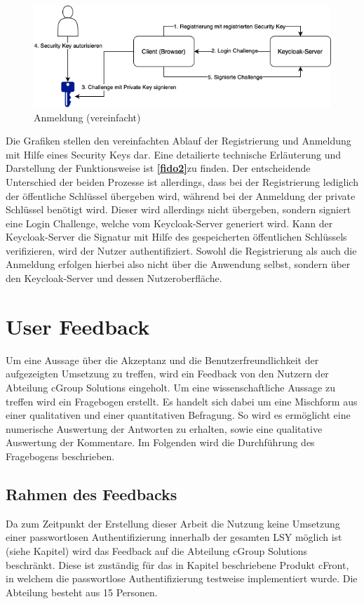 \begin{figure}[H]
	\centering 
	\includegraphics[width=1\textwidth]{img/abbildungen/login_simplified.png}
	\captionsetup{format=hang}
	\caption{Anmeldung (vereinfacht)}
\end{figure}

Die Grafiken stellen den vereinfachten Ablauf der Registrierung und Anmeldung mit Hilfe eines Security Keys dar. Eine detailierte technische Erläuterung und Darstellung der Funktionsweise ist \textbf{\ref{fido2}}zu finden. Der entscheidende Unterschied der beiden Prozesse ist allerdings, dass bei der Registrierung lediglich der öffentliche Schlüssel übergeben wird, während bei der Anmeldung der private Schlüssel benötigt wird. Dieser wird allerdings nicht übergeben, sondern signiert eine Login Challenge, welche vom Keycloak-Server generiert wird. Kann der Keycloak-Server die Signatur mit Hilfe des gespeicherten öffentlichen Schlüssels verifizieren, wird der Nutzer authentifiziert. Sowohl die Registrierung als auch die Anmeldung erfolgen hierbei also nicht über die Anwendung selbst, sondern über den Keycloak-Server und dessen Nutzeroberfläche.

\section{User Feedback}
Um eine Aussage über die Akzeptanz und die Benutzerfreundlichkeit der aufgezeigten Umsetzung zu treffen, wird ein Feedback von den Nutzern der Abteilung cGroup Solutions eingeholt. Um eine wissenschaftliche Aussage zu treffen wird ein Fragebogen erstellt. Es handelt sich dabei um eine Mischform aus einer qualitativen und einer quantitativen Befragung. So wird es ermöglicht eine numerische Auswertung der Antworten zu erhalten, sowie eine qualitative Auswertung der Kommentare. Im Folgenden wird die Durchführung des Fragebogens beschrieben.

\subsection{Rahmen des Feedbacks}
Da zum Zeitpunkt der Erstellung dieser Arbeit die Nutzung keine Umsetzung einer passwortlosen Authentifizierung innerhalb der gesamten \ac{LSY} möglich ist (siehe Kapitel) wird das Feedback auf die Abteilung cGroup Solutions beschränkt. Diese ist zuständig für das in Kapitel beschriebene Produkt cFront, in welchem die passwortlose Authentifizierung testweise implementiert wurde. Die Abteilung besteht aus 15 Personen.


